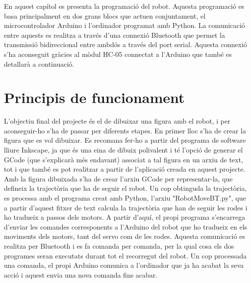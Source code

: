 






En aquest capítol es presenta la programació del robot. Aquesta programació es basa principalment en dos grans blocs que actuen conjuntament, el microcontrolador Arduino i l’ordinador programat amb Python. La comunicació entre aquests es realitza a través d’una connexió Bluetooth que permet la transmissió bidireccional entre ambdós a través del port serial. Aquesta connexió s’ha aconseguit gràcies al mòdul HC-05 connectat a l’Arduino que també es detallarà a continuació.


\section{Principis de funcionament}

L’objectiu final del projecte és el de dibuixar una figura amb el robot, i per aconseguir-ho s’ha de passar per diferents etapes. En primer lloc s’ha de crear la figura que es vol dibuixar. Es recomana fer-ho a partir del programa de software lliure Inkscape, ja que és una eina de dibuix polivalent i té l’opció de generar el GCode (que s’explicarà més endavant) associat a tal figura en un arxiu de text, tot i que també es pot realitzar a partir de l’aplicació creada en aquest projecte. Amb la figura dibuixada s’ha de crear l’arxiu GCode per representar-la, que defineix la trajectòria que ha de seguir el robot. Un cop obtinguda la trajectòria, es processa amb el programa creat amb Python, l’arxiu "RobotMoveBT.py", que a partir d’aquest fitxer de text calcula la trajectòria que han de seguir les rodes i ho tradueix a passos dels motors. A partir d’aquí, el propi programa s’encarrega d’enviar les comandes corresponents a l’Arduino del robot que ho tradueix en els moviments dels motors, tant del servo com de les rodes. Aquesta comunicació es realitza per Bluetooth i es fa comanda per comanda, per la qual cosa els dos programes seran  executats durant tot el recorregut del robot. Un cop processada una comanda, el propi Arduino comunica a l'ordinador que ja ha acabat la seva acció i aquest envia una nova comanda fins acabar.


